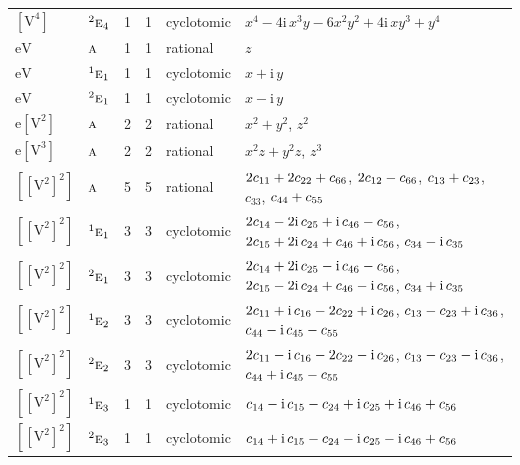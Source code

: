 \documentclass[10pt,a4paper]{article}
\numberwithin{equation}{section}
\newcommand{\irr}[1]{\text{\normalfont\scshape #1}}
\newcommand{\conjpair}[1]{{}^{#1}}
\newcommand{\iunit}{\mathrm{i}}
\newcommand{\jahn}[1]{\mathrm{#1}}
\newlength{\fillwidth}\newlength{\cellwidth}\newlength{\colwidth}
\newcommand{\signbreak}{\penalty100\relax}
\begin{document}
{\begin{longtable}{@{}llrrl>{\RaggedRight\arraybackslash}p{\fillwidth}@{}}
$\jahn{[V^{4}]}$ & $\conjpair{2}\irr{e}_{4}$ & 1 & 1 & cyclotomic & $x^{4} - 4\iunit{}\,x^{3}y - 6x^{2}y^{2} + 4\iunit{}\,xy^{3} + y^{4}$\\
$\jahn{eV}$ & $\irr{a}$ & 1 & 1 & rational & $z$\\
$\jahn{eV}$ & $\conjpair{1}\irr{e}_{1}$ & 1 & 1 & cyclotomic & $x + \iunit{}\,y$\\
$\jahn{eV}$ & $\conjpair{2}\irr{e}_{1}$ & 1 & 1 & cyclotomic & $x - \iunit{}\,y$\\
$\jahn{e[V^{2}]}$ & $\irr{a}$ & 2 & 2 & rational & $x^{2} + y^{2}$, $z^{2}$\\
$\jahn{e[V^{3}]}$ & $\irr{a}$ & 2 & 2 & rational & $x^{2}z + y^{2}z$, $z^{3}$\\
$\jahn{[[V^{2}]^{2}]}$ & $\irr{a}$ & 5 & 5 & rational & $2c_{11} +\signbreak 2c_{22} +\signbreak c_{66}$, $2c_{12} -\signbreak c_{66}$, $c_{13} +\signbreak c_{23}$, $c_{33}$, $c_{44} +\signbreak c_{55}$\\
$\jahn{[[V^{2}]^{2}]}$ & $\conjpair{1}\irr{e}_{1}$ & 3 & 3 & cyclotomic & $2c_{14} -\signbreak 2\iunit{}\,c_{25} +\signbreak \iunit{}\,c_{46} -\signbreak c_{56}$, $2c_{15} +\signbreak 2\iunit{}\,c_{24} +\signbreak c_{46} +\signbreak \iunit{}\,c_{56}$, $c_{34} -\signbreak \iunit{}\,c_{35}$\\
$\jahn{[[V^{2}]^{2}]}$ & $\conjpair{2}\irr{e}_{1}$ & 3 & 3 & cyclotomic & $2c_{14} +\signbreak 2\iunit{}\,c_{25} -\signbreak \iunit{}\,c_{46} -\signbreak c_{56}$, $2c_{15} -\signbreak 2\iunit{}\,c_{24} +\signbreak c_{46} -\signbreak \iunit{}\,c_{56}$, $c_{34} +\signbreak \iunit{}\,c_{35}$\\
$\jahn{[[V^{2}]^{2}]}$ & $\conjpair{1}\irr{e}_{2}$ & 3 & 3 & cyclotomic & $2c_{11} +\signbreak \iunit{}\,c_{16} -\signbreak 2c_{22} +\signbreak \iunit{}\,c_{26}$, $c_{13} -\signbreak c_{23} +\signbreak \iunit{}\,c_{36}$, $c_{44} -\signbreak \iunit{}\,c_{45} -\signbreak c_{55}$\\
$\jahn{[[V^{2}]^{2}]}$ & $\conjpair{2}\irr{e}_{2}$ & 3 & 3 & cyclotomic & $2c_{11} -\signbreak \iunit{}\,c_{16} -\signbreak 2c_{22} -\signbreak \iunit{}\,c_{26}$, $c_{13} -\signbreak c_{23} -\signbreak \iunit{}\,c_{36}$, $c_{44} +\signbreak \iunit{}\,c_{45} -\signbreak c_{55}$\\
$\jahn{[[V^{2}]^{2}]}$ & $\conjpair{1}\irr{e}_{3}$ & 1 & 1 & cyclotomic & $c_{14} -\signbreak \iunit{}\,c_{15} -\signbreak c_{24} +\signbreak \iunit{}\,c_{25} +\signbreak \iunit{}\,c_{46} +\signbreak c_{56}$\\
$\jahn{[[V^{2}]^{2}]}$ & $\conjpair{2}\irr{e}_{3}$ & 1 & 1 & cyclotomic & $c_{14} +\signbreak \iunit{}\,c_{15} -\signbreak c_{24} -\signbreak \iunit{}\,c_{25} -\signbreak \iunit{}\,c_{46} +\signbreak c_{56}$\\

\end{longtable}}
\end{document}
